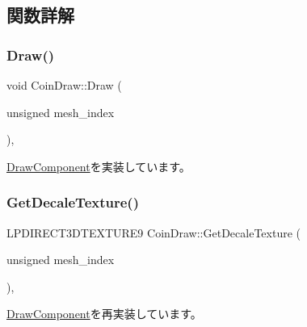 \subsection{関数詳解}
\mbox{\label{class_coin_draw_a57e3f327324db9ec3debc702d14325c7}} 
\subsubsection{\texorpdfstring{Draw()}{Draw()}}
{\footnotesize\ttfamily void Coin\+Draw\+::\+Draw (\begin{DoxyParamCaption}\item[{unsigned}]{mesh\+\_\+index }\end{DoxyParamCaption})\hspace{0.3cm}{\ttfamily [override]}, {\ttfamily [virtual]}}



\mbox{\hyperlink{class_draw_component_ae84bfb6ccc2fda9e54cdff45057ea2c3}{Draw\+Component}}を実装しています。

\mbox{\label{class_coin_draw_aa3132d69a3dd903e79331b3c4b46ab79}} 
\subsubsection{\texorpdfstring{Get\+Decale\+Texture()}{GetDecaleTexture()}}
{\footnotesize\ttfamily L\+P\+D\+I\+R\+E\+C\+T3\+D\+T\+E\+X\+T\+U\+R\+E9 Coin\+Draw\+::\+Get\+Decale\+Texture (\begin{DoxyParamCaption}\item[{unsigned}]{mesh\+\_\+index }\end{DoxyParamCaption})\hspace{0.3cm}{\ttfamily [override]}, {\ttfamily [virtual]}}



\mbox{\hyperlink{class_draw_component_a9ea98f4bcdfd76782d5234122b132c3d}{Draw\+Component}}を再実装しています。

\mbox{\label{class_coin_draw_a4582370e7ec4c1259b2a91cc185fbe09}} 
